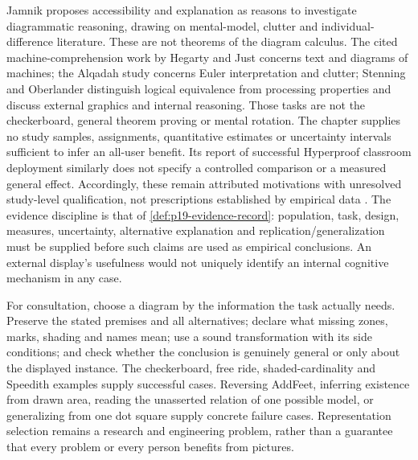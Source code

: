 Jamnik proposes accessibility and explanation as reasons to investigate
diagrammatic reasoning, drawing on mental-model, clutter and individual-
difference literature. These are not theorems of the diagram calculus.
The cited machine-comprehension work by Hegarty and Just concerns text
and diagrams of machines; the Alqadah study concerns Euler interpretation
and clutter; Stenning and Oberlander distinguish logical equivalence from
processing properties and discuss external graphics and internal reasoning.
Those tasks are not the checkerboard, general theorem proving or mental
rotation. The chapter supplies no study samples, assignments, quantitative
estimates or uncertainty intervals sufficient to infer an all-user benefit.
Its report of successful Hyperproof classroom deployment similarly does
not specify a controlled comparison or a measured general effect.
Accordingly, these remain attributed motivations with unresolved
study-level qualification, not prescriptions established by empirical data
\cite[pp.~717,719,722, note~7]{Jamnik2021LogicalDiagrams}.
The evidence discipline is that of \cref{def:p19-evidence-record}:
population, task, design, measures, uncertainty, alternative explanation
and replication/generalization must be supplied before such claims are
used as empirical conclusions. An external display's usefulness would
not uniquely identify an internal cognitive mechanism in any case.

For consultation, choose a diagram by the information the task actually
needs. Preserve the stated premises and all alternatives; declare what
missing zones, marks, shading and names mean; use a sound transformation
with its side conditions; and check whether the conclusion is genuinely
general or only about the displayed instance. The checkerboard, free
ride, shaded-cardinality and Speedith examples supply successful cases.
Reversing AddFeet, inferring existence from drawn area, reading the
unasserted relation of one possible model, or generalizing from one
dot square supply concrete failure cases. Representation selection
remains a research and engineering problem, rather than a guarantee
that every problem or every person benefits from pictures.

